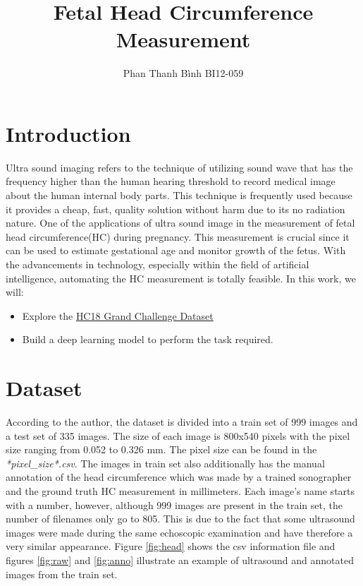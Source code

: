 \documentclass[conference]{IEEEtran}
\title{Fetal Head Circumference Measurement}
\author{Phan Thanh Bình BI12-059}
\begin{document}
\maketitle

\section{Introduction}
Ultra sound imaging refers to the technique of utilizing sound wave that has the frequency higher than the human hearing threshold to record medical image about the human internal body parts. This technique is frequently used because it provides a cheap, fast, quality solution without harm due to its no radiation nature. One of the applications of ultra sound image in the measurement of fetal head circumference(HC) during pregnancy. This measurement is crucial since it can be used to estimate gestational age and monitor growth of the fetus. With the advancements in technology, especially within the field of artificial intelligence, automating the HC measurement is totally feasible. In this work, we will:
\begin{itemize}
    \item Explore the \href{https://hc18.grand-challenge.org/}{HC18 Grand Challenge Dataset}
    \item Build a deep learning model to perform the task required.
\end{itemize}

\section{Dataset}
According to the author, the dataset is divided into a train set of 999 images and a test set of 335 images. The size of each image is 800x540 pixels with the pixel size ranging from 0.052 to 0.326 mm. The pixel size can be found in the \emph{*pixel\_size*.csv}. The images in train set also additionally has the manual annotation of the head circumference which was made by a trained sonographer and the ground truth HC measurement in millimeters. Each image's name starts with a number, however, although 999 images are present in the train set, the number of filenames only go to 805. This is due to the fact that some ultrasound images were made during the same echoscopic examination and have therefore a very similar appearance. Figure \ref{fig:head} shows the csv information file and figures \ref{fig:raw} and \ref{fig:anno} illustrate an example of ultrasound and annotated images from the train set.
\end{document}
